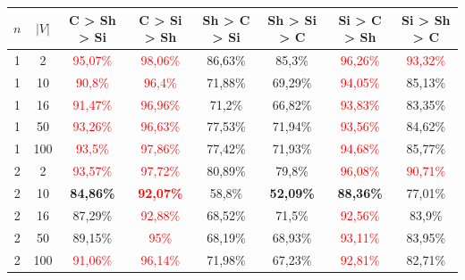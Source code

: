 \begin{table}[ht]
    \centering
    \begin{tabular}{cc|c|c|c|c|c|c}
        \toprule
        $n$ & $|V|$ & \textbf{C > Sh > Si}     & \textbf{C > Si > Sh}              & \textbf{Sh > C > Si}     & \textbf{Sh > Si > C}     & \textbf{Si > C > Sh}     & \textbf{Si > Sh > C}     \\\midrule
        {1} & {2}   & \textcolor{red}{95,07\%} & \textcolor{red}{98,06\%}          & {86,63\%}                & {85,3\%}                 & \textcolor{red}{96,26\%} & \textcolor{red}{93,32\%} \\
        {1} & {10}  & \textcolor{red}{90,8\%}  & \textcolor{red}{96,4\%}           & {71,88\%}                & {69,29\%}                & \textcolor{red}{94,05\%} & {85,13\%}                \\
        {1} & {16}  & \textcolor{red}{91,47\%} & \textcolor{red}{96,96\%}          & {71,2\%}                 & {66,82\%}                & \textcolor{red}{93,83\%} & {83,35\%}                \\
        {1} & {50}  & \textcolor{red}{93,26\%} & \textcolor{red}{96,63\%}          & {77,53\%}                & {71,94\%}                & \textcolor{red}{93,56\%} & {84,62\%}                \\
        {1} & {100} & \textcolor{red}{93,5\%}  & \textcolor{red}{97,86\%}          & {77,42\%}                & {71,93\%}                & \textcolor{red}{94,68\%} & {85,77\%}                \\
        {2} & {2}   & \textcolor{red}{93,57\%} & \textcolor{red}{97,72\%}          & {80,89\%}                & {79,8\%}                 & \textcolor{red}{96,08\%} & \textcolor{red}{90,71\%} \\
        {2} & {10}  & \textbf{84,86\%}         & \textcolor{red}{\textbf{92,07\%}} & {58,8\%}                 & \textbf{52,09\%}         & \textbf{88,36\%}         & {77,01\%}                \\
        {2} & {16}  & {87,29\%}                & \textcolor{red}{92,88\%}          & {68,52\%}                & {71,5\%}                 & \textcolor{red}{92,56\%} & {83,9\%}                 \\
        {2} & {50}  & {89,15\%}                & \textcolor{red}{95\%}             & {68,19\%}                & {68,93\%}                & \textcolor{red}{93,11\%} & {83,95\%}                \\
        {2} & {100} & \textcolor{red}{91,06\%} & \textcolor{red}{96,14\%}          & {71,98\%}                & {67,23\%}                & \textcolor{red}{92,81\%} & {82,71\%}                \\

\end{tabular}
\end{table}
